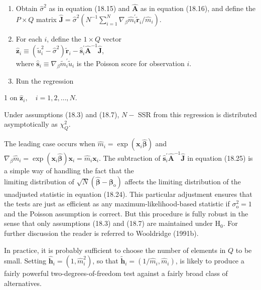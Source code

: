 \documentclass[10pt]{article}
\begin{document}
\begin{enumerate}
  \item Obtain $\hat{\sigma}^{2}$ as in equation (18.15) and $\hat{\mathbf{A}}$ as in equation (18.16), and define the $P \times Q$ matrix $\hat{\mathbf{J}}=\hat{\sigma}^{2}\left(N^{-1} \sum_{i=1}^{N} \nabla_{\beta} \hat{m}_{i}^{\prime} \tilde{\mathbf{r}}_{i} / \hat{m}_{i}\right)$.
  \item For each $i$, define the $1 \times Q$ vector\\
$\hat{\mathbf{z}}_{i} \equiv\left(\tilde{u}_{i}^{2}-\hat{\sigma}^{2}\right) \tilde{\mathbf{r}}_{i}-\hat{\mathbf{s}}_{i}^{\prime} \hat{\mathbf{A}}^{-1} \hat{\mathbf{J}}$,\\
where $\hat{\mathbf{s}}_{i} \equiv \nabla_{\beta} \tilde{m}_{i}^{\prime} \tilde{u}_{i}$ is the Poisson score for observation $i$.
  \item Run the regression
\end{enumerate}

1 on $\hat{\mathbf{z}}_{i}, \quad i=1,2, \ldots, N$.

Under assumptions (18.3) and (18.7), $N-$ SSR from this regression is distributed asymptotically as $\chi_{Q}^{2}$.

The leading case occurs when $\hat{m}_{i}=\exp \left(\mathbf{x}_{i} \hat{\boldsymbol{\beta}}\right)$ and $\nabla_{\beta} \hat{m}_{i}=\exp \left(\mathbf{x}_{i} \hat{\boldsymbol{\beta}}\right) \mathbf{x}_{i}=\hat{m}_{i} \mathbf{x}_{i}$. The subtraction of $\hat{\mathbf{s}}_{i}^{\prime} \hat{\mathbf{A}}^{-1} \hat{\mathbf{J}}$ in equation (18.25) is a simple way of handling the fact that the\\
limiting distribution of $\sqrt{N}\left(\hat{\boldsymbol{\beta}}-\boldsymbol{\beta}_{\mathrm{o}}\right)$ affects the limiting distribution of the unadjusted statistic in equation (18.24). This particular adjustment ensures that the tests are just as efficient as any maximum-likelihood-based statistic if $\sigma_{\mathrm{o}}^{2}=1$ and the Poisson assumption is correct. But this procedure is fully robust in the sense that only assumptions (18.3) and (18.7) are maintained under $\mathrm{H}_{0}$. For further discussion the reader is referred to Wooldridge (1991b).

In practice, it is probably sufficient to choose the number of elements in $Q$ to be small. Setting $\hat{\mathbf{h}}_{i}=\left(1, \hat{m}_{i}^{2}\right)$, so that $\tilde{\mathbf{h}}_{i}=\left(1 / \hat{m}_{i}, \hat{m}_{i}\right)$, is likely to produce a fairly powerful two-degrees-of-freedom test against a fairly broad class of alternatives.
\end{document}
